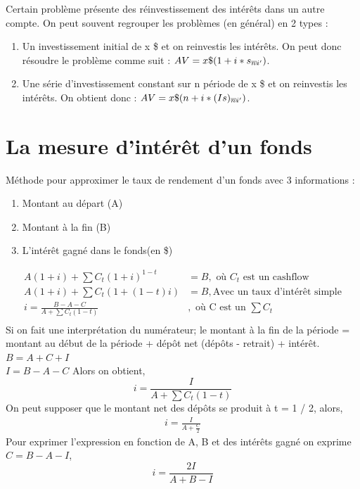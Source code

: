 \documentclass[11pt,french]{report}
\makeatletter
\DeclareRobustCommand{\annuity}[1]{%
\def\arraystretch{0}%
\setlength\arraycolsep{.7pt}%
\setlength\arrayrulewidth{.3pt}%
\begin{array}[b]{@{}c|}\hline
\\[\arraycolsep]%
\scriptstyle #1%
\end{array}%
}
\makeatother
\begin{document}
Certain problème présente des réinvestissement des intérêts dans un autre compte. On peut souvent regrouper les problèmes (en général) en 2 types :
\begin{enumerate}
\item Un investissement initial de x \$ et on reinvestis les intérêts. On peut donc résoudre le problème comme suit : $AV= x\$ (1 + i*s_{\annuity{n}i'})$.
\item Une série d'investissement constant sur n période de x \$ et on reinvestis les intérêts. On obtient donc : $AV = x\$ (n  + i*(Is)_{\annuity{n}i'})$.
\end{enumerate}

\section{La mesure d'intérêt d'un fonds}
\label{sec:mesure intérêt d'un fonds}

Méthode pour approximer le taux de rendement d'un fonds avec 3 informations :
\begin{enumerate}
\item Montant au départ (A)
\item Montant à la fin (B)
\item L'intérêt gagné dans le fonds(en \$)
\end{enumerate}
\begin{align*}
A(1+i) + \sum C_{t}(1+i)^{1-t} & = B, \text{ où $C_t$ est un cashflow} \\
A(1+i) + \sum C_{t}(1+(1-t)i) & = B, \text{Avec un taux d'intérêt simple}\\
i = \frac{B - A - C}{A + \sum C_{t}(1 - t)} & , \text{ où C est un $\sum C_t$} \\
\end{align*}
Si on fait une interprétation du numérateur; le montant à la fin de la période = montant au début de la période + dépôt net (dépôts - retrait) + intérêt. 
\\$B = A + C +I$
\\$I= B- A - C$
Alors on obtient,
\begin{equation}
\label{eq:chap5:equation I}
i = \frac{I}{A + \sum C_{t}(1 - t)}
\end{equation}
On peut supposer que le montant net des dépôts se produit à t = 1 / 2, alors,
\begin{align*}
i = \frac{I}{A + \frac{C}{2}}
\end{align*}
Pour exprimer l'expression en fonction de A, B et des intérêts gagné on exprime $ C = B -A -I$,
\begin{equation}
i = \frac{2I}{A + B - I}
\end{equation}
\end{document}
